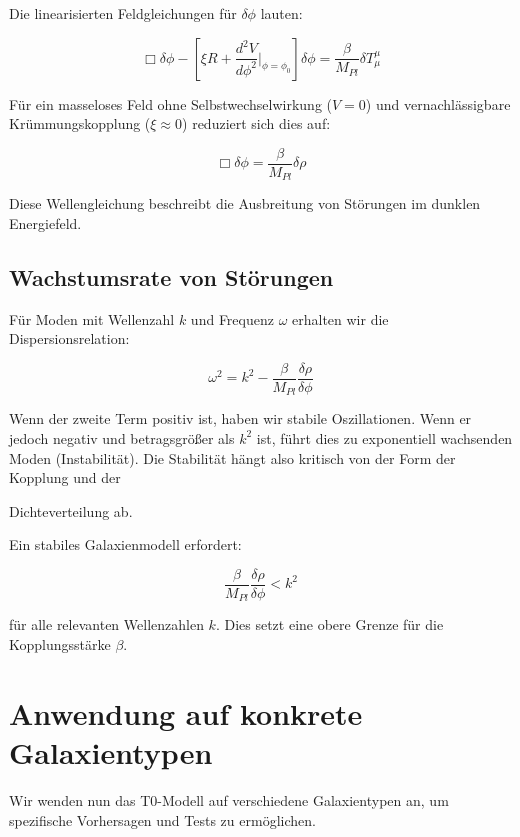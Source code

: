\documentclass[a4paper,12pt]{article}
\begin{document}
	Die linearisierten Feldgleichungen für $\delta\phi$ lauten:
	
	\begin{equation}
	\Box\delta\phi - \left[\xi R + \frac{d^2V}{d\phi^2}\bigg|_{\phi=\phi_0}\right]\delta\phi = \frac{\beta}{M_{Pl}}\delta T^{\mu}_{\mu}
	\end{equation}
	
	Für ein masseloses Feld ohne Selbstwechselwirkung ($V = 0$) und vernachlässigbare Krümmungskopplung ($\xi \approx 0$) reduziert sich dies auf:
	
	\begin{equation}
	\Box\delta\phi = \frac{\beta}{M_{Pl}}\delta\rho
	\end{equation}
	
	Diese Wellengleichung beschreibt die Ausbreitung von Störungen im dunklen Energiefeld.
	
	\subsection{Wachstumsrate von Störungen}
	
	Für Moden mit Wellenzahl $k$ und Frequenz $\omega$ erhalten wir die Dispersionsrelation:
	
	\begin{equation}
	\omega^2 = k^2 - \frac{\beta}{M_{Pl}}\frac{\delta\rho}{\delta\phi}
	\end{equation}
	
	Wenn der zweite Term positiv ist, haben wir stabile Oszillationen. Wenn er jedoch negativ und betragsgrößer als $k^2$ ist, führt dies zu exponentiell wachsenden Moden (Instabilität). Die Stabilität hängt also kritisch von der Form der Kopplung und der

	Dichteverteilung ab.
	
	Ein stabiles Galaxienmodell erfordert:
	
	\begin{equation}
		\frac{\beta}{M_{Pl}}\frac{\delta\rho}{\delta\phi} < k^2
	\end{equation}
	
	für alle relevanten Wellenzahlen $k$. Dies setzt eine obere Grenze für die Kopplungsstärke $\beta$.
	
	\section{Anwendung auf konkrete Galaxientypen}
	
	Wir wenden nun das T0-Modell auf verschiedene Galaxientypen an, um spezifische Vorhersagen und Tests zu ermöglichen.
	
\end{document}
